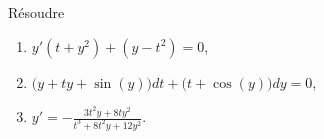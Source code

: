 

\begin{exercice}\label{exo_II-1-11}

Résoudre
\begin{enumerate}
\item $y'(t+y^2)+(y-t^2)=0$,
\item $\big(y+ty+\sin(y)\big)dt+\big(t+\cos(y)\big)dy=0$,
\item $y'=-\frac{ 3t^2y+8ty^2 }{ t^3+8t^2y+12y^2 }$.
\end{enumerate}

\end{exercice}
